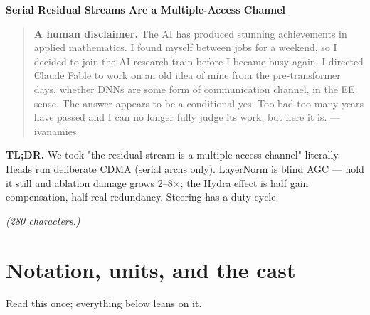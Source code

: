 \documentclass[10pt]{article}
\begin{document}
\begin{center}{\LARGE\bfseries Serial Residual Streams Are a Multiple-Access Channel}\end{center}

\begin{quote}\textbf{A human disclaimer.} The AI has produced stunning achievements in applied mathematics. I found myself between jobs for a weekend, so I decided to join the AI research train before I became busy again. I directed Claude Fable to work on an old idea of mine from the pre-transformer days, whether DNNs are some form of communication channel, in the EE sense. The answer appears to be a conditional yes. Too bad too many years have passed and I can no longer fully judge its work, but here it is. --- ivanamies\end{quote}

\textbf{TL;DR.} We took "the residual stream is a multiple-access channel" literally. Heads run deliberate CDMA
(serial archs only). LayerNorm is blind AGC --- hold it still and ablation damage grows 2--8$\times$; the
Hydra effect is half gain compensation, half real redundancy. Steering has a duty cycle.

\emph{(280 characters.)}

\section{Notation, units, and the cast}

Read this once; everything below leans on it.
\end{document}
